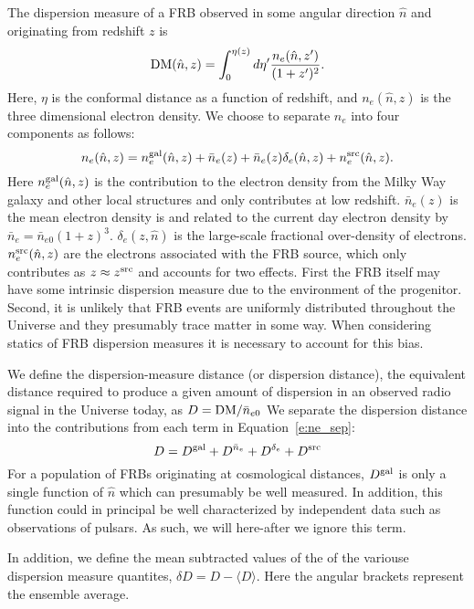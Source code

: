 \documentclass[onecolumn,prd,noshowpacs,nofootinbib,amsmath,amssymb]{revtex4}
\newcommand{\Dgal}{D^{\rm gal}}
\newcommand{\Dne}{D^{\bar{n}_e}}
\newcommand{\Dde}{D^{\delta_e}}
\newcommand{\Dsrc}{D^{\rm src}}
\newcommand{\del}{\delta\!}
\begin{document}
The dispersion measure of a FRB observed in some angular direction $\hat{n}$ and
originating from redshift $z$ is
\begin{equation}
    {\rm DM}(\hat{n}, z) = \int_0^{\eta(z)} d\eta'
        \frac{n_e(\hat{n}, z')}{(1+z')^2}.
\end{equation}
Here, $\eta$ is the conformal distance as a function of redshift, and
$n_e(\hat{n}, z)$ is the three dimensional electron density.  We choose to
separate $n_e$ into four components as follows:
\begin{equation}
\label{e:ne_sep}
n_e(\hat{n}, z) = n_e^{\rm gal}(\hat{n}, z) + \bar{n}_e(z) +
    \bar{n}_e(z)\delta_e(\hat{n}, z) + n_e^{\rm src}(\hat{n}, z).
\end{equation}
Here $n_e^{\rm gal}(\hat{n}, z)$ is the contribution to the electron density
from the Milky Way galaxy and other local structures and only contributes at
low redshift. $\bar{n}_e(z)$ is the mean electron density is and related to the
current day electron density by $\bar{n}_e = \bar{n}_{e0} (1+z)^3$. 
$\delta_e(z,\hat{n})$ is the large-scale fractional over-density of electrons.
$n_e^{\rm src}(\hat{n}, z)$ are the electrons associated with the FRB source,
which only contributes as $z \approx z^{\rm src}$ and accounts for two effects.
First the FRB itself
may have some intrinsic dispersion measure due to the environment of the
progenitor.  Second, it is unlikely that FRB events are uniformly distributed
throughout the Universe and they presumably trace matter in some way. When
considering statics of FRB dispersion measures it is necessary to account for
this bias.

We define the dispersion-measure distance (or dispersion distance),
the equivalent distance required to
produce a given amount of dispersion in an observed radio signal in the
Universe today, as $ D = {{\rm DM}}/{\bar{n}_{e0}}$
We separate the dispersion distance into the contributions from each
term in Equation~\ref{e:ne_sep}:
\begin{equation}
\label{e:D_sep}
D = \Dgal + \Dne + \Dde + \Dsrc
\end{equation}
For a population of FRBs originating at cosmological distances, $\Dgal$
is only a single function of $\hat{n}$ which can presumably be well
measured.  In addition, this function could in principal be well characterized
by independent data such as observations of pulsars.  As such, we will
here-after we ignore this term.

In addition, we define the mean subtracted values of the of the variouse dispersion
measure quantites, $\del D = D - \langle D \rangle$. Here the angular brackets represent
the ensemble average.
\end{document}
